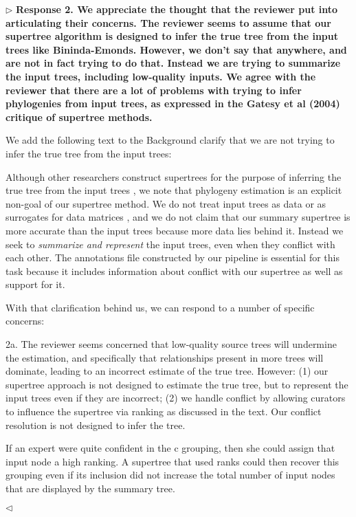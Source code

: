 \documentclass{article}
\newenvironment{reply}{$\triangleright$\bf}{$\triangleleft$}
\renewenvironment{quote}
               {\list{}{\rightmargin\leftmargin}%
                \item\relax\normalfont}
               {\endlist}
\begin{document}
\begin{reply}
Response 2. We appreciate the thought that the reviewer put into articulating their concerns. The reviewer seems to assume that our supertree algorithm is designed to infer the true tree from the input trees like Bininda-Emonds.  However, we don't say that anywhere, and are not in fact trying to do that.  Instead we are trying to summarize the input trees, including low-quality inputs.  We agree with the reviewer that there are a lot of problems with trying to infer phylogenies from input trees, as expressed in the Gatesy et al (2004) critique of supertree methods.

We add the following text to the Background clarify that we are not trying to infer the true tree from the input trees:
\begin{quote}
Although other researchers construct supertrees for the purpose of
inferring the true tree from the input trees \citep{BinindaEmonds2007b,Davis2014},
we note that phylogeny estimation is an explicit non-goal of our
supertree method.  We do not treat input trees as data or as surrogates for
data matrices \citep{gatesy2004critique}, and we do not claim that our
summary supertree is more accurate than the input trees because more
data lies behind it. Instead we seek to \emph{summarize and represent}
the input trees, even when they conflict with each other.  The
annotations file constructed by our pipeline is essential for this
task because it includes information about conflict with our supertree
as well as support for it.
\end{quote}

With that clarification behind us, we can respond to a number of specific concerns:

2a. The reviewer seems concerned that low-quality source trees will undermine the estimation, and specifically that relationships present in more trees will dominate, leading to an incorrect estimate of the true tree. 
However: (1) our supertree approach is not designed to estimate the true tree, but to represent the input trees even if they are incorrect; (2) we handle conflict by allowing curators to influence the supertree via ranking as discussed in the text.  Our conflict resolution is not designed to infer the tree.

\begin{quote}
If an expert were quite confident in the c grouping, then she could assign that input node a high ranking. A supertree that used ranks could then recover this grouping even if its inclusion did not increase the total number of input nodes that are displayed by the summary tree.
\end{quote}


\end{reply}
\end{document}
